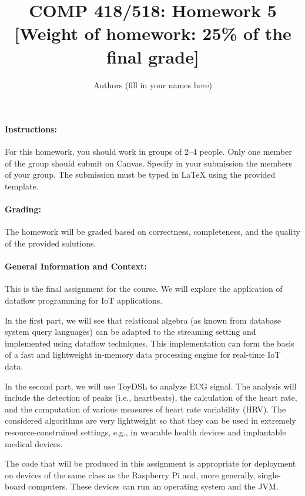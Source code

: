 \documentclass[11pt]{article}
\begin{document}
\title{COMP 418/518: Homework 5 \\[1ex] \large [Weight of homework: 25\% of the final grade]}
\author{Authors (fill in your names here)}

\maketitle


\paragraph{Instructions:}

For this homework, you should work in groups of 2--4 people. Only one member of the group should submit on Canvas. Specify in your submission the members of your group. The submission must be typed in LaTeX using the provided template.

\paragraph{Grading:}

The homework will be graded based on correctness, completeness, and the quality of the provided solutions.

\paragraph{General Information and Context:}

This is the final assignment for the course. We will explore the application of dataflow programming for IoT applications.

In the first part, we will see that relational algebra (as known from database system query languages) can be adapted to the streaming setting and implemented using dataflow techniques. This implementation can form the basis of a fast and lightweight in-memory data processing engine for real-time IoT data.

In the second part, we will use ToyDSL to analyze ECG signal. The analysis will include the detection of peaks (i.e., heartbeats), the calculation of the heart rate, and the computation of various measures of heart rate variability (HRV). The considered algorithms are very lightweight so that they can be used in extremely resource-constrained settings, e.g., in wearable health devices and implantable medical devices.

The code that will be produced in this assignment is appropriate for deployment on devices of the same class as the Raspberry Pi and, more generally, single-board computers. These devices can run an operating system and the JVM.
\end{document}
